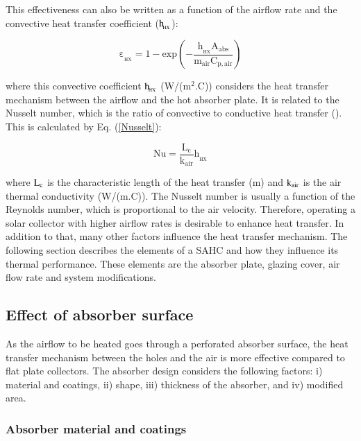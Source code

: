 This effectiveness can also be written as a function of the airflow rate and the convective heat transfer coefficient ($\rm{h_{\!_{HX}}}$):

\begin{equation}
	\mathrm{\varepsilon_{\!_{HX}} = 1 - exp\left(-\frac{h_{\!_{HX}}A_{abs}}{m_{air}C_{p,air}}\right)}
	\label{effectiveness}
\end{equation}

\noindent where this convective coefficient $\rm{h_{\!_{HX}}}$ (W/(m$^2$.\textdegree C)) considers the heat transfer mechanism between the airflow and the hot absorber plate. It is related to the Nusselt number, which is the ratio of convective to conductive heat transfer (\cite{Incropera2006}). This is calculated by Eq. (\ref{Nusselt}):
	
\begin{equation}
	\mathrm{Nu = \frac{L_c}{k_{air}}{h_{\!_{HX}}}}
	\label{Nusselt}
\end{equation}

\noindent where $\rm{L_c}$ is the characteristic length of the heat transfer (m) and $\rm{k_{air}}$ is the air thermal conductivity (W/(m.\textdegree C)). The Nusselt number is usually a function of the Reynolds number, which is proportional to the air velocity. Therefore, operating a solar collector with higher airflow rates is desirable to enhance heat transfer. In addition to that, many other factors influence the heat transfer mechanism. The following section describes the elements of a SAHC and how they influence its thermal performance. These elements are the absorber plate, glazing cover, air flow rate and system modifications.

\subsection{Effect of absorber surface}  

As the airflow to be heated goes through a perforated absorber surface, the heat transfer mechanism between the holes and the air is more effective compared to flat plate collectors. The absorber design considers the following factors: i) material and coatings, ii) shape, iii) thickness of the absorber, and iv) modified area.

\subsubsection{Absorber material and coatings} 

